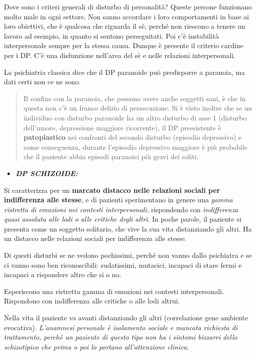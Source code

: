 \documentclass[]{article}
\begin{document}
Dove sono i criteri generali di disturbo di personalità? Queste persone
funzionano molto male in ogni settore. Non sanno accordare i loro
comportamenti in base ai loro obiettivi, che è qualcosa che riguarda il
sè, perché non riescono a tenere un lavoro ad esempio, in quanto si
sentono perseguitati. Poi c'è instabilità interpersonale sempre per la
stessa causa. Dunque è presente il criterio cardine per i DP. C'è una
disfunzione nell'area del sè e nelle relazioni interpersonali.

La psichiatria classica dice che il DP paranoide può predisporre a
paranoia, ma dati certi non ce ne sono.

\begin{quote}
Il confine con la paranoia, che possono avere anche soggetti sani, è che
in questa non c'è un franco delirio di persecuzione. Si è visto inoltre
che se un individuo con disturbo paranoide ha un altro disturbo di asse
1 (disturbo dell'umore, depressione maggiore ricorrente), il DP
preesistente è \textbf{patoplastico} nei confronti del secondo disturbo
(episodio depressivo) e come conseguenza, durante l'episodio depressivo
maggiore è più probabile che il paziente abbia episodi paranoici più
gravi dei soliti.
\end{quote}

\begin{itemize}
\item
  \textbf{\emph{DP SCHIZOIDE:}}
\end{itemize}

Si caratterizza per un \textbf{marcato distacco nelle relazioni sociali
per indifferenza alle stesse}, e di pazienti sperimentano in genere una
\emph{gamma ristretta di emozioni nei contesti interpersonali},
rispondendo con \emph{indifferenza quasi assoluta alle lodi o alle
critiche degli altri}. In poche parole, il paziente si presenta come un
soggetto solitario, che vive la sua vita distanziando gli altri. Ha un
distacco nelle relazioni sociali per indifferenza alle stesse.

Di questi disturbi se ne vedono pochissimi, perché non vanno dallo
psichiatra e se ci vanno sono ben riconoscibili: sudatissimi, mutacici,
incapaci di stare fermi e incapaci a rispondere altro che si o no.

Esperiscono una ristretta gamma di emozioni nei contesti interpersonali.
Rispondono con indifferenza alle critiche o alle lodi altrui.

Nella vita il paziente va avanti distanziando gli altri (correlazione
gene ambiente evocativa). \emph{\emph{L'anamnesi personale è isolamento
sociale e mancata richiesta di trattamento, perché un paziente di questo
tipo non ha i sintomi bizzarri dello schizotipico che prima o poi lo
portano all'attenzione clinica. }}
\end{document}
